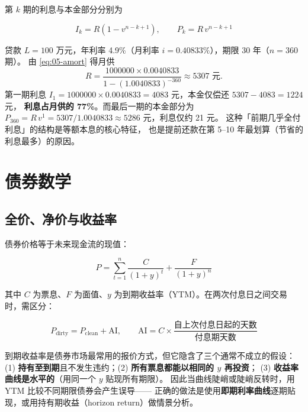 第 $k$ 期的利息与本金部分分别为

\begin{equation}
  I_k = R\left(1-v^{n-k+1}\right), \qquad P_k = R\,v^{n-k+1}
  \label{eq:05-amort-split}
\end{equation}

\begin{example}[房贷摊销的第一期与最后一期]\label{ex:05-mortgage}
贷款 $L = 100$ 万元，年利率 4.9\%（月利率 $i = 0.40833\%$），期限 30 年（$n = 360$ 期）。
由 \cref{eq:05-amort} 得月供
\[
  R = \frac{1000000\times0.0040833}{1-(1.0040833)^{-360}} \approx 5307 \text{ 元}.
\]
第一期利息 $I_1 = 1000000\times0.0040833 = 4083$ 元，本金仅偿还 $5307-4083 = 1224$ 元，
\textbf{利息占月供的 77\%}。而最后一期的本金部分为
$P_{360} = R\,v^{1} = 5307/1.0040833 \approx 5286$ 元，利息仅约 21 元。
这种「前期几乎全付利息」的结构是等额本息的核心特征，
也是提前还款在第 5--10 年最划算（节省的利息最多）的原因。
\end{example}

\section{债券数学}

\subsection{全价、净价与收益率}

债券价格等于未来现金流的现值：

\begin{equation}
  P = \sum_{t=1}^{n}\frac{C}{(1+y)^{t}} + \frac{F}{(1+y)^{n}}
  \label{eq:05-bond}
\end{equation}

其中 $C$ 为票息、$F$ 为面值、$y$ 为到期收益率（YTM）。在两次付息日之间交易时，需区分：

\begin{equation}
  P_{\text{dirty}} = P_{\text{clean}} + \text{AI},
  \qquad \text{AI} = C\times\frac{\text{自上次付息日起的天数}}{\text{付息期天数}}
  \label{eq:05-dirty}
\end{equation}

\begin{warningbox}
到期收益率是债券市场最常用的报价方式，但它隐含了三个通常不成立的假设：
(1) \textbf{持有至到期}且不发生违约；(2) \textbf{所有票息都能以相同的 $y$ 再投资}；
(3) \textbf{收益率曲线是水平的}（用同一个 $y$ 贴现所有期限）。
因此当曲线陡峭或陡峭反转时，用 YTM 比较不同期限债券会产生误导——
正确的做法是使用\textbf{即期利率曲线}逐期贴现，或用持有期收益（horizon return）做情景分析。
\end{warningbox}

